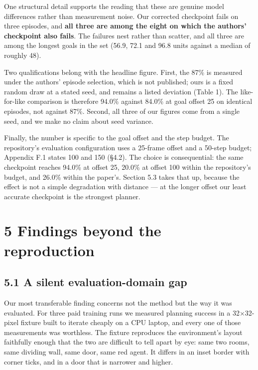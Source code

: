 \documentclass[10pt]{article}
\begin{document}
One structural detail supports the reading that these are genuine model
differences rather than measurement noise. Our corrected checkpoint fails on
three episodes, and \textbf{all three are among the eight on which the authors'
checkpoint also fails}. The failures nest rather than scatter, and all three
are among the longest goals in the set (56.9, 72.1 and 96.8 units against a
median of roughly 48).

Two qualifications belong with the headline figure. First, the 87\% is measured
under the authors' episode selection, which is not published; ours is a fixed
random draw at a stated seed, and remains a listed deviation (Table 1). The like-for-like comparison is therefore 94.0\% against 84.0\% at goal offset 25
on identical episodes, not against 87\%. Second, all three of our figures come from a single
seed, and we make no claim about seed variance.

Finally, the number is specific to the goal offset and the step budget. The
repository's evaluation configuration uses a 25-frame offset and a 50-step
budget; Appendix F.1 states 100 and 150 (\S{}4.2). The choice is consequential:
the same checkpoint reaches 94.0\% at offset 25, 20.0\% at offset 100 within the
repository's budget, and 26.0\% within the paper's. Section 5.3 takes that up,
because the effect is not a simple degradation with distance --- at the longer
offset our least accurate checkpoint is the strongest planner.

\section{5 Findings beyond the reproduction}\label{findings-beyond-the-reproduction}

\subsection{5.1 A silent evaluation-domain gap}\label{a-silent-evaluation-domain-gap}

Our most transferable finding concerns not the method but the way it was
evaluated. For three paid training runs we measured planning success in a
32$\times$32-pixel fixture built to iterate cheaply on a CPU laptop, and every one of
those measurements was worthless. The fixture reproduces the environment's
layout faithfully enough that the two are difficult to tell apart by eye: same
two rooms, same dividing wall, same door, same red agent. It differs in an
inset border with corner ticks, and in a door that is narrower and higher.
\end{document}
